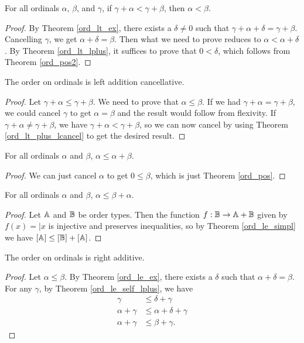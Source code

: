 \documentclass[../../math.tex]{subfiles}
\begin{document}
\begin{theorem} \label{ord_lt_plus_lcancel}
    For all ordinals $\alpha$, $\beta$, and $\gamma$, if $\gamma + \alpha <
    \gamma + \beta$, then $\alpha < \beta$.
\end{theorem}
\begin{proof}
    By Theorem \ref{ord_lt_ex}, there exists a $\delta \neq 0$ such that $\gamma
    + \alpha + \delta = \gamma + \beta$.  Cancelling $\gamma$, we get $\alpha +
    \delta = \beta$.  Then what we need to prove reduces to $\alpha < \alpha +
    \delta$.  By Theorem \ref{ord_lt_lplus}, it suffices to prove that $0 <
    \delta$, which follows from Theorem \ref{ord_pos2}.
\end{proof}

\begin{instance}
    The order on ordinals is left addition cancellative.
\end{instance}
\begin{proof}
    Let $\gamma + \alpha \leq \gamma + \beta$.  We need to prove that $\alpha
    \leq \beta$.  If we had $\gamma + \alpha = \gamma + \beta$, we could cancel
    $\gamma$ to get $\alpha = \beta$ and the result would follow from flexivity.
    If $\gamma + \alpha \neq \gamma + \beta$, we have $\gamma + \alpha < \gamma
    + \beta$, so we can now cancel by using Theorem \ref{ord_lt_plus_lcancel} to
    get the desired result.
\end{proof}

\begin{theorem} \label{ord_le_self_rplus}
    For all ordinals $\alpha$ and $\beta$, $\alpha \leq \alpha + \beta$.
\end{theorem}
\begin{proof}
    We can just cancel $\alpha$ to get $0 \leq \beta$, which is just Theorem
    \ref{ord_pos}.
\end{proof}

\begin{theorem} \label{ord_le_self_lplus}
    For all ordinals $\alpha$ and $\beta$, $\alpha \leq \beta + \alpha$.
\end{theorem}
\begin{proof}
    Let $\mathbb{A}$ and $\mathbb{B}$ be order types.  Then the function $f : \mathbb{B} \to \mathbb{A} + \mathbb{B}$
    given by $f(x) = |x$ is injective and preserves inequalities, so by Theorem
    \ref{ord_le_simpl} we have $[\mathbb{A}] \leq [\mathbb{B}] + [\mathbb{A}]$.
\end{proof}

\begin{instance}
    The order on ordinals is right additive.
\end{instance}
\begin{proof}
    Let $\alpha \leq \beta$.  By Theorem \ref{ord_le_ex}, there exists a
    $\delta$ such that $\alpha + \delta = \beta$.  For any $\gamma$, by Theorem
    \ref{ord_le_self_lplus}, we have
    \begin{align*}
        \gamma &\leq \delta + \gamma \\
        \alpha + \gamma &\leq \alpha + \delta + \gamma \\
        \alpha + \gamma &\leq \beta + \gamma.
    \end{align*}
\end{proof}
\end{document}
